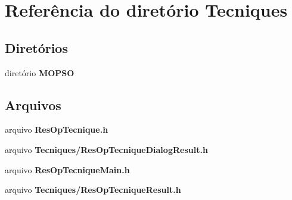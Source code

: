 \section{Referência do diretório Tecniques}
\label{dir_45b229a80e9efa88357aa2999a69bb8c}
\subsection*{Diretórios}
\begin{DoxyCompactItemize}
\item 
diretório {\bf M\+O\+P\+SO}
\end{DoxyCompactItemize}
\subsection*{Arquivos}
\begin{DoxyCompactItemize}
\item 
arquivo {\bf Res\+Op\+Tecnique.\+h}
\item 
arquivo {\bf Tecniques/\+Res\+Op\+Tecnique\+Dialog\+Result.\+h}
\item 
arquivo {\bf Res\+Op\+Tecnique\+Main.\+h}
\item 
arquivo {\bf Tecniques/\+Res\+Op\+Tecnique\+Result.\+h}
\end{DoxyCompactItemize}
